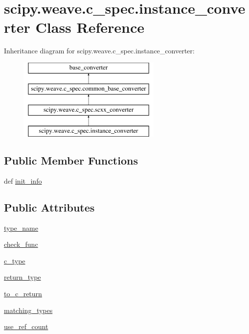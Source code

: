 \hypertarget{classscipy_1_1weave_1_1c__spec_1_1instance__converter}{}\section{scipy.\+weave.\+c\+\_\+spec.\+instance\+\_\+converter Class Reference}
\label{classscipy_1_1weave_1_1c__spec_1_1instance__converter}
Inheritance diagram for scipy.\+weave.\+c\+\_\+spec.\+instance\+\_\+converter\+:\begin{figure}[H]
\begin{center}
\leavevmode
\includegraphics[height=4.000000cm]{classscipy_1_1weave_1_1c__spec_1_1instance__converter}
\end{center}
\end{figure}
\subsection*{Public Member Functions}
\begin{DoxyCompactItemize}
\item 
def \hyperlink{classscipy_1_1weave_1_1c__spec_1_1instance__converter_a7cdd57831ec492382648c3d68aa28ee7}{init\+\_\+info}
\end{DoxyCompactItemize}
\subsection*{Public Attributes}
\begin{DoxyCompactItemize}
\item 
\hyperlink{classscipy_1_1weave_1_1c__spec_1_1instance__converter_aedd9c3d4276452ea06d4b794c521eb69}{type\+\_\+name}
\item 
\hyperlink{classscipy_1_1weave_1_1c__spec_1_1instance__converter_aeb4a72c30687b95784bd98a31f9633bf}{check\+\_\+func}
\item 
\hyperlink{classscipy_1_1weave_1_1c__spec_1_1instance__converter_a7ee401fa910156cabd921c413058b27d}{c\+\_\+type}
\item 
\hyperlink{classscipy_1_1weave_1_1c__spec_1_1instance__converter_ac597af0aff3cae32984b46bd546c9a82}{return\+\_\+type}
\item 
\hyperlink{classscipy_1_1weave_1_1c__spec_1_1instance__converter_a7fdc3a3e4eb68a7f6ba3135b3e58c0bf}{to\+\_\+c\+\_\+return}
\item 
\hyperlink{classscipy_1_1weave_1_1c__spec_1_1instance__converter_a16c6ad15cf2ce3e5cb5588fedbafbc5c}{matching\+\_\+types}
\item 
\hyperlink{classscipy_1_1weave_1_1c__spec_1_1instance__converter_a779a6910f9f0f62be6da6e555a1a03c3}{use\+\_\+ref\+\_\+count}
\end{DoxyCompactItemize}


